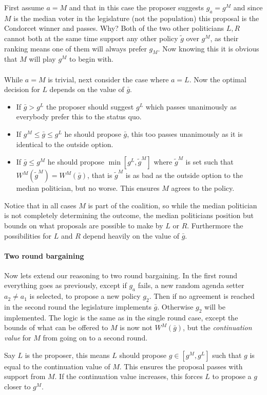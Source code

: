 First assume $a=M$ and that in this case the proposer suggests $g_a=g^M$ and since $M$ is the median voter in the legislature (not the population) this proposal is the Condorcet winner and passes. Why? Both of the two other politicians $L,R$ cannot both at the same time support any other policy $\tilde{g}$ over $g^M$, as their ranking means one of them will always prefer $g_M$. Now knowing this it is obvious that $M$ will play $g^M$ to begin with.
\\ \\
While $a=M$ is trivial, next consider the case where $a=L$. Now the optimal decision for $L$ depends on the value of $\bar{g}$.
\begin{itemize}
    \item If $\bar{g}>g^L$ the proposer should suggest $g^L$ which passes unanimously as everybody prefer this to the status quo. 
    \item If $g^M \leq \bar{g} \leq g^L$ he should propose $\bar{g}$, this too passes unanimously as it is identical to the outside option. 
    \item If $\bar{g} \leq g^M$ he should propose $\min[g^L, \tilde{g}^M]$ where $\tilde{g}^M$ is set such that $W^M(\tilde{g}^M)=W^M(\bar{g})$, that is $\tilde{g}^M$ is as bad as the outside option to the median politician, but no worse. This ensures $M$ agrees to the policy.
\end{itemize}
Notice that in all cases $M$ is part of the coalition, so while the median politician is not completely determining the outcome, the median politicians position but bounds on what proposals are possible to make by $L$ or $R$. Furthermore the possibilities for $L$ and $R$ depend heavily on the value of $\bar{g}$.

\paragraph{Two round bargaining} Now lets extend our reasoning to two round bargaining. In the first round everything goes as previously, except if $g_a$ fails, a new random agenda setter $a_2 \neq a_1$ is selected, to propose a new policy $g_2$. Then if no agreement is reached in the second round the legislature implements $\bar{g}$. Otherwise $g_2$ will be implemented. The logic is the same as in the single round case, except the bounds of what can be offered to $M$ is now not $W^M(\bar{g})$, but the \textit{continuation value} for $M$ from going on to a second round.

Say $L$ is the proposer, this means $L$ should propose $g\in[g^M, g^L]$ such that $g$ is equal to the continuation value of $M$. This ensures the proposal passes with support from $M$. If the continuation value increases, this forces $L$ to propose a $g$ closer to $g^M$.

